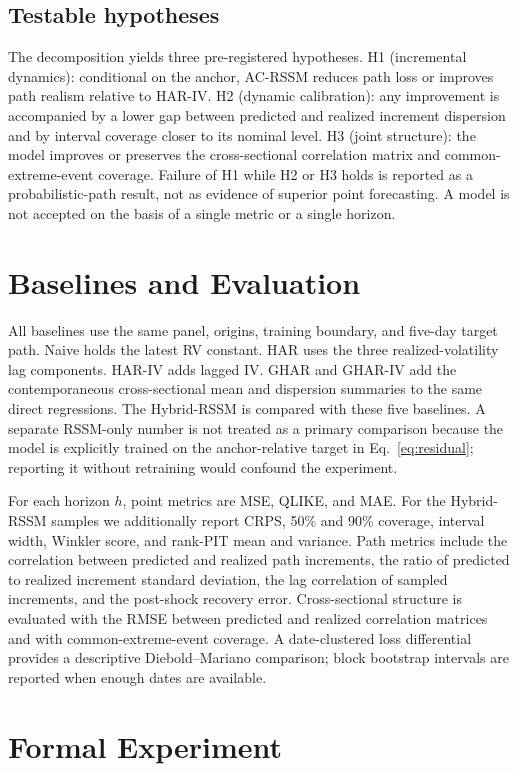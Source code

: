 \documentclass[11pt]{article}
\begin{document}
\subsection{Testable hypotheses}
The decomposition yields three pre-registered hypotheses. H1 (incremental dynamics): conditional on the anchor, AC-RSSM reduces path loss or improves path realism relative to HAR-IV. H2 (dynamic calibration): any improvement is accompanied by a lower gap between predicted and realized increment dispersion and by interval coverage closer to its nominal level. H3 (joint structure): the model improves or preserves the cross-sectional correlation matrix and common-extreme-event coverage. Failure of H1 while H2 or H3 holds is reported as a probabilistic-path result, not as evidence of superior point forecasting. A model is not accepted on the basis of a single metric or a single horizon.

\section{Baselines and Evaluation}

All baselines use the same panel, origins, training boundary, and five-day target path. Naive holds the latest RV constant. HAR uses the three realized-volatility lag components. HAR-IV adds lagged IV. GHAR and GHAR-IV add the contemporaneous cross-sectional mean and dispersion summaries to the same direct regressions. The Hybrid-RSSM is compared with these five baselines. A separate RSSM-only number is not treated as a primary comparison because the model is explicitly trained on the anchor-relative target in Eq.~\eqref{eq:residual}; reporting it without retraining would confound the experiment.

For each horizon $h$, point metrics are MSE, QLIKE, and MAE. For the Hybrid-RSSM samples we additionally report CRPS, 50\% and 90\% coverage, interval width, Winkler score, and rank-PIT mean and variance. Path metrics include the correlation between predicted and realized path increments, the ratio of predicted to realized increment standard deviation, the lag correlation of sampled increments, and the post-shock recovery error. Cross-sectional structure is evaluated with the RMSE between predicted and realized correlation matrices and with common-extreme-event coverage. A date-clustered loss differential provides a descriptive Diebold--Mariano comparison; block bootstrap intervals are reported when enough dates are available.

\section{Formal Experiment}
\end{document}

